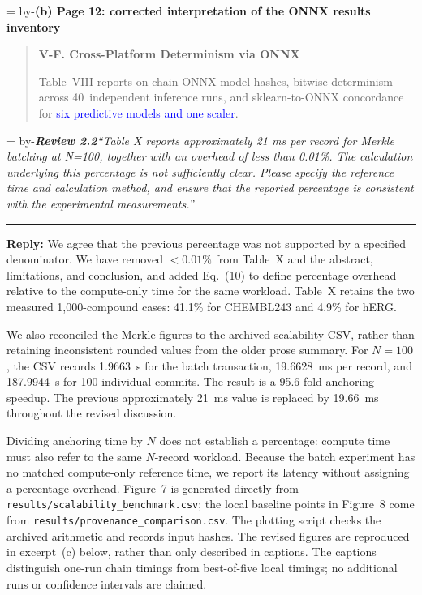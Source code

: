 \documentclass[11pt]{article}
\newenvironment{excerpt}{\begin{quote}\small\sloppy}{\end{quote}}
\newcommand{\roomfor}[1]{\par\begingroup\dimen0=\pagegoal\advance\dimen0 by-\pagetotal\ifdim\dimen0<#1\baselineskip\newpage\fi\endgroup}
\newcommand{\review}[2]{\roomfor{10}\bigskip\noindent\textbf{\textit{Review #1}}\quad\textit{``#2''}\par\smallskip\hrule\medskip}
\newcommand{\reply}{\noindent\textbf{Reply:} }
\newcommand{\loc}[1]{\roomfor{7}\medskip\noindent\textbf{#1}\par\smallskip}
\newcommand{\mshead}[2]{\par\noindent\textbf{#1. #2}\par\smallskip}
\begin{document}
\loc{(b) Page 12: corrected interpretation of the ONNX results inventory}
\begin{excerpt}
\mshead{V-F}{Cross-Platform Determinism via ONNX}

Table~VIII reports on-chain ONNX model hashes,
bitwise determinism across 40~independent inference runs,
and sklearn-to-ONNX concordance for \textcolor{blue}{six predictive models and one scaler}.
\end{excerpt}

\review{2.2}{Table X reports approximately 21 ms per record for Merkle batching at N=100, together with an overhead of less than 0.01\%. The calculation underlying this percentage is not sufficiently clear. Please specify the reference time and calculation method, and ensure that the reported percentage is consistent with the experimental measurements.}

\reply We agree that the previous percentage was not
supported by a specified denominator. We have removed $<0.01\%$ from
Table~X and the abstract, limitations, and conclusion, and added Eq.~(10)
to define percentage overhead relative to the compute-only time for the
same workload. Table~X retains the two measured 1,000-compound cases:
41.1\% for CHEMBL243 and 4.9\% for hERG.

We also reconciled the Merkle figures to the archived scalability CSV,
rather than retaining inconsistent rounded values from the older prose
summary. For $N=100$, the CSV records 1.9663~s for the batch transaction,
19.6628~ms per record, and 187.9944~s for 100 individual commits. The
result is a 95.6-fold anchoring speedup. The previous approximately
21~ms value is replaced by 19.66~ms throughout the revised discussion.

Dividing anchoring time by $N$ does not establish a percentage: compute
time must also refer to the same $N$-record workload. Because the batch
experiment has no matched compute-only reference time, we report its
latency without assigning a percentage overhead. Figure~7 is generated
directly from \nolinkurl{results/scalability_benchmark.csv}; the local
baseline points in Figure~8 come from
\nolinkurl{results/provenance_comparison.csv}. The plotting script checks
the archived arithmetic and records input hashes. The revised figures
are reproduced in excerpt~(c) below, rather than only described in captions. The captions distinguish
one-run chain timings from best-of-five local timings; no additional runs
or confidence intervals are claimed.
\end{document}
